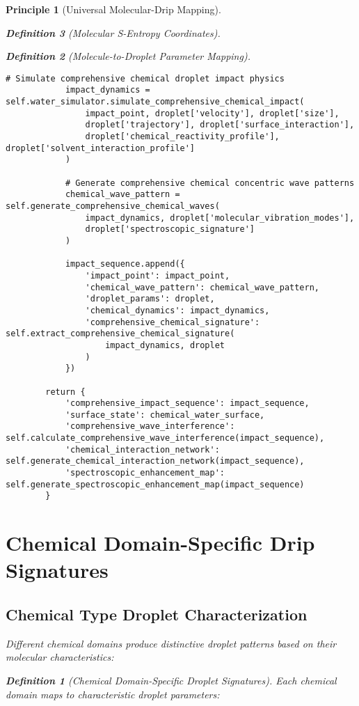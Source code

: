 \documentclass[12pt,a4paper]{article}
\newtheorem{definition}{Definition}
\newtheorem{principle}{Principle}
\begin{document}
\begin{principle}[Universal Molecular-Drip Mapping]
\begin{definition}[Molecular S-Entropy Coordinates]
\begin{definition}[Molecule-to-Droplet Parameter Mapping]
\begin{algorithm}
\begin{algorithmic}[1]
\begin{lstlisting}[style=pythonstyle, caption=Core Molecule-to-Drip Implementation for Comprehensive Chemical Analysis]
            # Simulate comprehensive chemical droplet impact physics
            impact_dynamics = self.water_simulator.simulate_comprehensive_chemical_impact(
                impact_point, droplet['velocity'], droplet['size'],
                droplet['trajectory'], droplet['surface_interaction'],
                droplet['chemical_reactivity_profile'], droplet['solvent_interaction_profile']
            )
            
            # Generate comprehensive chemical concentric wave patterns
            chemical_wave_pattern = self.generate_comprehensive_chemical_waves(
                impact_dynamics, droplet['molecular_vibration_modes'],
                droplet['spectroscopic_signature']
            )
            
            impact_sequence.append({
                'impact_point': impact_point,
                'chemical_wave_pattern': chemical_wave_pattern,
                'droplet_params': droplet,
                'chemical_dynamics': impact_dynamics,
                'comprehensive_chemical_signature': self.extract_comprehensive_chemical_signature(
                    impact_dynamics, droplet
                )
            })
        
        return {
            'comprehensive_impact_sequence': impact_sequence,
            'surface_state': chemical_water_surface,
            'comprehensive_wave_interference': self.calculate_comprehensive_wave_interference(impact_sequence),
            'chemical_interaction_network': self.generate_chemical_interaction_network(impact_sequence),
            'spectroscopic_enhancement_map': self.generate_spectroscopic_enhancement_map(impact_sequence)
        }
\end{lstlisting}

\section{Chemical Domain-Specific Drip Signatures}

\subsection{Chemical Type Droplet Characterization}

Different chemical domains produce distinctive droplet patterns based on their molecular characteristics:

\begin{definition}[Chemical Domain-Specific Droplet Signatures]
Each chemical domain maps to characteristic droplet parameters:


\end{definition}
\end{algorithmic}
\end{algorithm}
\end{definition}
\end{definition}
\end{principle}
\end{document}

